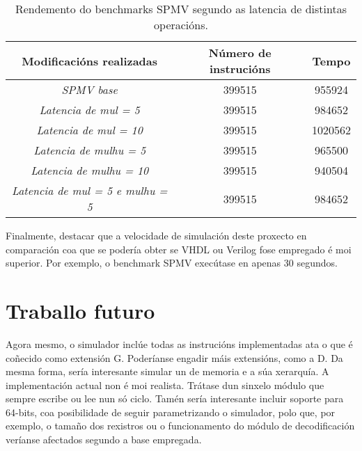 \begin{table}[hp!]
    \centering
    \begin{tabular}{c|c|c}
    \rowcolor{udcpink!25}
    \textbf{Modificacións realizadas} & \textbf{Número de instrucións}  & \textbf{Tempo} 
    \\\hline
    \textit{SPMV base} & 399515 & 955924 \\
    \textit{Latencia de mul = 5} & 399515 & 984652\\
    \textit{Latencia de mul = 10} & 399515 & 1020562\\
     \textit{Latencia de mulhu = 5} & 399515 & 965500\\ 
    \textit{Latencia de mulhu = 10} & 399515 & 940504\\ %
    \textit{Latencia de mul = 5 e mulhu = 5} & 399515 & 984652\\
    \end{tabular}
    \caption{Rendemento do benchmarks SPMV segundo as latencia de distintas operacións.}
    \label{tab:rendemento_spmv}
\end{table}

Finalmente, destacar que a velocidade de simulación deste proxecto en comparación coa que se podería obter se VHDL ou Verilog fose empregado é moi superior. Por exemplo, o benchmark SPMV execútase en apenas 30 segundos.

\section{Traballo futuro}\label{chap:traballo_futuro}
Agora mesmo, o simulador inclúe todas as instrucións implementadas ata o que é coñecido como extensión G. Poderíanse engadir máis extensións, como a D. Da mesma forma, sería interesante simular un de memoria e a súa xerarquía. A implementación actual non é moi realista. Trátase dun sinxelo módulo que sempre escribe ou lee nun só ciclo. Tamén sería interesante incluir soporte para 64-bits, coa posibilidade de seguir parametrizando o simulador, polo que, por exemplo, o tamaño dos rexistros ou o funcionamento do módulo de decodificación veríanse afectados segundo a base empregada.


